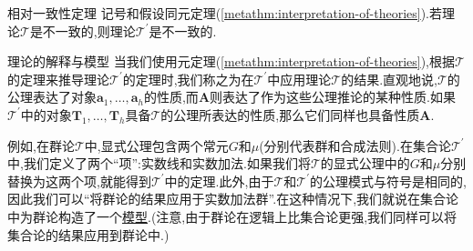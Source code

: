 \begin{corollary}{相对一致性定理}{}
	记号和假设同元定理(\cref{metathm:interpretation-of-theories}).若理论$\mathcal{T}$是不一致的,则理论$\mathcal{T}^{\prime}$是不一致的.
\end{corollary}

\begin{remark}{理论的解释与模型}{}
	当我们使用元定理(\cref{metathm:interpretation-of-theories}),根据$\mathcal{T}$的定理来推导理论$\mathcal{T}^{\prime}$的定理时,我们称之为在$\mathcal{T}^{\prime}$中应用理论$\mathcal{T}$的结果.直观地说,$\mathcal{T}$的公理表达了对象$\boldsymbol{a}_{1},\ldots,\boldsymbol{a}_{h}$的性质,而$\boldsymbol{A}$则表达了作为这些公理推论的某种性质.如果$\mathcal{T}^{\prime}$中的对象$\boldsymbol{T}_{1},\ldots,\boldsymbol{T}_{h}$具备$\mathcal{T}$的公理所表达的性质,那么它们同样也具备性质$\boldsymbol{A}$.
	
	例如,在群论$\mathcal{T}$中,显式公理包含两个常元$G$和$\mu$(分别代表群和合成法则).在集合论$\mathcal{T}^{\prime}$中,我们定义了两个``项'':实数线和实数加法.如果我们将$\mathcal{T}$的显式公理中的$G$和$\mu$分别替换为这两个项,就能得到$\mathcal{T}^{\prime}$中的定理.此外,由于$\mathcal{T}$和$\mathcal{T}^{\prime}$的公理模式与符号是相同的,因此我们可以``将群论的结果应用于实数加法群''.在这种情况下,我们就说在集合论中为群论构造了一个\underline{模型}.(注意,由于群论在逻辑上比集合论更强,我们同样可以将集合论的结果应用到群论中.)
\end{remark}